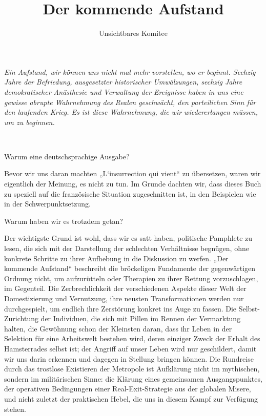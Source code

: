 \usepackage[ngerman,french]{babel}
\usepackage[T1]{fontenc}

\newcommand\extrapar\medskip
\newcommand{\satz}[1]{#1\extrapar\noindent}

\setcounter{tocdepth}{1}


\raggedbottom
{}

\title{Der kommende Aufstand}
\author{Unsichtbares Komitee}
\date{}
\maketitle

\textit{Ein Aufstand, wir können uns nicht mal mehr vorstellen, wo er 
beginnt. Sechzig Jahre der Befriedung, ausgesetzter historischer 
Umwälzungen, sechzig Jahre demokratischer Anästhesie und Verwaltung 
der Ereignisse haben in uns eine gewisse abrupte Wahrnehmung des Realen 
geschwächt, den parteilichen Sinn für den laufenden Krieg. Es ist diese 
Wahrnehmung, die wir wiedererlangen müssen, um zu beginnen.}

~

Warum eine deutschsprachige Ausgabe?

Bevor wir uns daran machten „L‘insurrection qui vient“ zu
übersetzen, waren wir eigentlich der Meinung, es nicht zu tun. Im
Grunde dachten wir, dass dieses Buch zu speziell auf die
französische Situation zugeschnitten ist, in den Beispielen wie in
der Schwerpunktsetzung.

Warum haben wir es trotzdem getan?

\extrapar{}

Der wichtigste Grund ist wohl, dass wir es satt haben, politische
Pamphlete zu lesen, die sich mit der Darstellung der schlechten
Verhältnisse begnügen, ohne konkrete Schritte zu ihrer Aufhebung in
die Diskussion zu werfen. „Der kommende Aufstand“ beschreibt die
bröckeligen Fundamente der gegenwärtigen Ordnung nicht, um
aufzurütteln oder Therapien zu ihrer Rettung vorzuschlagen, im
Gegenteil. Die Zerbrechlichkeit der verschiedenen Aspekte dieser
Welt der Domestizierung und Vernutzung, ihre neusten
Transformationen werden nur durchgespielt, um endlich ihre
Zerstörung konkret ins Auge zu fassen. Die Selbst-Zurichtung der
Individuen, die sich mit Pillen im Rennen der Vermarktung halten,
die Gewöhnung schon der Kleinsten daran, dass ihr Leben in der
Selektion für eine Arbeitswelt bestehen wird, deren einziger Zweck
der Erhalt des Hamsterrades selbst ist; der Angriff auf unser Leben
wird nur geschildert, damit wir uns darin erkennen und dagegen in
Stellung bringen können. Die Rundreise durch das trostlose
Existieren der Metropole ist Aufklärung nicht im mythischen,
sondern im militärischen Sinne: die Klärung eines gemeinsamen
Ausgangspunktes, der operativen Bedingungen einer
Real-Exit-Strategie aus der globalen Misere, und nicht zuletzt der
praktischen Hebel, die uns in diesem Kampf zur Verfügung stehen.
\extrapar{}

